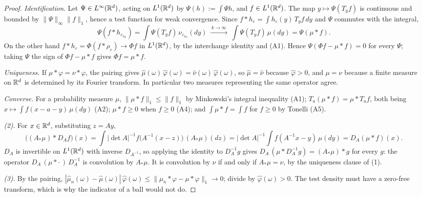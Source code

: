 \begin{proof}
\emph{Identification.} Let $\Psi \in L^\infty(\mathbb{R}^d)$, acting on $L^1(\mathbb{R}^d)$ by
$\Psi(h) := \int\Psi h$, and $f \in L^1(\mathbb{R}^d)$. The map $y \mapsto \Psi(T_yf)$ is continuous and
bounded by $\|\Psi\|_\infty\|f\|_1$, hence a test function for weak convergence. Since
$f * h_\varepsilon = \int h_\varepsilon(y)\,T_yf\,dy$ and $\Psi$ commutes with the integral,
\[
  \Psi(f * h_{\varepsilon_{n_k}}) = \int\Psi(T_yf)\,\nu_{\varepsilon_{n_k}}(dy)
  \ \xrightarrow{\ k \to \infty\ }\ \int\Psi(T_yf)\,\mu(dy) = \Psi(\mu * f) .
\]
On the other hand $f * h_\varepsilon = \Phi(f * \rho_\varepsilon) \to \Phi f$ in $L^1(\mathbb{R}^d)$, by
the interchange identity and (A1). Hence $\Psi(\Phi f - \mu * f) = 0$ for every $\Psi$; taking
$\Psi$ the sign of $\Phi f - \mu * f$ gives $\Phi f = \mu * f$.

\emph{Uniqueness.} If $\mu * \varphi = \nu * \varphi$, the pairing gives
$\widehat\mu(\omega)\,\widehat\varphi(\omega) = \widehat\nu(\omega)\,\widehat\varphi(\omega)$, so
$\widehat\mu = \widehat\nu$ because $\widehat\varphi > 0$, and $\mu = \nu$ because a finite measure
on $\mathbb{R}^d$ is determined by its Fourier transform. In particular two measures representing the
same operator agree.

\emph{Converse.} For a probability measure $\mu$, $\|\mu * f\|_1 \le \|f\|_1$ by Minkowski's
integral inequality (A1); $T_a(\mu * f) = \mu * T_af$, both being
$x \mapsto \int f(x - a - y)\,\mu(dy)$ (A2); $\mu * f \ge 0$ when $f \ge 0$ (A4); and
$\int\mu * f = \int f$ for $f \ge 0$ by Tonelli (A5).

\emph{(2).} For $x \in \mathbb{R}^d$, substituting $z = Ay$,
\[
  \bigl((A_*\mu) * D_Af\bigr)(x) = \int |\det A|^{-1}f\bigl(A^{-1}(x - z)\bigr)\,(A_*\mu)(dz)
  = |\det A|^{-1}\int f(A^{-1}x - y)\,\mu(dy) = D_A(\mu * f)(x) .
\]
$D_A$ is invertible on $L^1(\mathbb{R}^d)$ with inverse $D_{A^{-1}}$, so applying the identity to
$D_A^{-1}g$ gives $D_A\,(\mu * D_A^{-1}g) = (A_*\mu) * g$ for every $g$: the operator
$D_A\,(\mu * \cdot\,)\,D_A^{-1}$ is convolution by $A_*\mu$. It is convolution by $\nu$ if and
only if $A_*\mu = \nu$, by the uniqueness clause of (1).

\emph{(3).} By the pairing, $|\widehat\mu_n(\omega) - \widehat\mu(\omega)|\,\widehat\varphi(\omega)
\le \|\mu_n * \varphi - \mu * \varphi\|_1 \to 0$; divide by $\widehat\varphi(\omega) > 0$. The test
density must have a zero-free transform, which is why the indicator of a ball would not do.


\end{proof}
